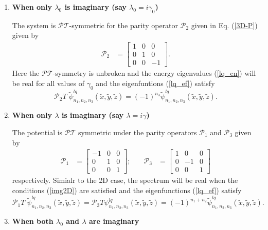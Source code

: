 \documentclass[a4paper, 12pt]{article}
\newcommand{\td}[1]{\tilde{#1}}
\begin{document}
\begin{enumerate}
  \item {\bf When only $\lambda_0$ is imaginary (say $\lambda_0=i\gamma_0$)}
  
  The system is $\mathcal{PT}$-symmetric for the parity operator $\mathcal{P}_2$ given in Eq. (\ref{3D-P}) given by
  \begin{equation}
    \begin{aligned}
        \mathcal{P}_2&= \begin{bmatrix}
            1 & 0 & 0 \\
            0 & 1 & 0 \\
            0 & 0 & -1    
        \end{bmatrix}.
    \end{aligned}
  \end{equation}
  Here the $\mathcal{PT}$-symmetry is unbroken and the energy eigenvalues (\ref{lq_en}) will be real for all values of $\gamma_0$ and the eigenfuntions (\ref{lq_ef}) satisfy
  \begin{equation}
  	\mathcal{P}_2 T\; \td{\psi}^{lq}_{n_1, n_2, n_3}(\td{x}, \td{y}, \td{z})=(-1)^{n_3} \td{\psi}^{lq}_{n_1, n_2, n_3}(\td{x}, \td{y}, \td{z}).\nonumber
  \end{equation}
  \item {\bf When only $\lambda$ is imaginary (say $\lambda=i\gamma$)}
  
  The potential is $\mathcal{PT}$ symmetric
  under the parity operators $\mathcal{P}_1$ and $\mathcal{P}_3$ given by
  \begin{equation}
    \begin{aligned}
        \mathcal{P}_1&= \begin{bmatrix}
            -1 & 0 & 0 \\
            0 & 1 & 0 \\
            0 & 0 & 1    
        \end{bmatrix} ; \quad &
        \mathcal{P}_3 &= \begin{bmatrix}
            1 & 0 & 0 \\
            0 & -1 & 0 \\
            0 & 0 & 1
        \end{bmatrix}
    \end{aligned}
  \end{equation}
  respectively. Simialr to the 2D case, the spectrum will be real when the conditions (\ref{img2D}) are satisfied and the eigenfunctions (\ref{lq_ef}) satisfy
  \begin{equation}
  	\mathcal{P}_1 T\; \td{\psi}^{lq}_{n_1, n_2, n_3}(\td{x}, \td{y}, \td{z})=\mathcal{P}_3 T \psi^{lq}_{n_1, n_2, n_3}(\td{x}, \td{y}, \td{z})=(-1)^{n_1+n_2} \td{\psi}^{lq}_{n_1, n_2, n_3}(\td{x}, \td{y}, \td{z}).\nonumber	
  \end{equation} 
 \item {\bf When both $\lambda_0$ and $\lambda$ are imaginary}
 

\end{enumerate}
\end{document}
